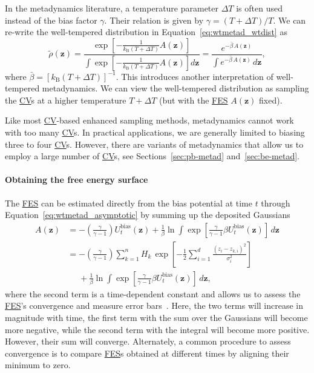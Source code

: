 \documentclass[9pt,review]{livecoms}
\newcommand{\vz}{\mathbf{z}}
\begin{document}
In the metadynamics literature, a temperature parameter $\Delta T$ is often used instead of the bias factor $\gamma$. Their relation is given by $\gamma = (T + \Delta T)/T$. We can re-write the well-tempered distribution in Equation~\ref{eq:wtmetad_wtdist} as 
\begin{equation}
\label{eq:wtmetad_wtdist_deltaT}
\tilde{\rho}(\vz) =
\frac
{\exp\left[-\frac{1}{k_\mathrm{B}(T+\Delta T)}A(\vz)\right]}
{\int \exp\left[-\frac{1}{k_\mathrm{B}(T+\Delta T)}A(\vz)\right] d\vz}=
\frac
{e^{-\bar{\beta} \, A(\vz)}}
{\int e^{-\bar{\beta} \, A(\vz)} \, d\vz},
\end{equation}
where $\bar{\beta}=\left[k_\mathrm{B}(T+\Delta T)\right]^{-1}$. This introduces another interpretation of well-tempered metadynamics. We can view the well-tempered distribution as sampling the \hyperlink{ref:CV} {CV}s at a higher temperature $T+\Delta T$ (but with the \hyperlink{ref:FES} {FES} $A(\vz)$ fixed). 

Like most \hyperlink{ref:CV} {CV}-based enhanced sampling methods, metadynamics cannot work with too many \hyperlink{ref:CV} {CV}s. In practical applications, we are generally limited to biasing three to four \hyperlink{ref:CV} {CV}s. However, there are variants of metadynamics that allow us to employ a large number of \hyperlink{ref:CV} {CV}s, see Sections~\ref{sec:pb-metad} and~\ref{sec:be-metad}.

\paragraph{Obtaining the free energy surface}
\label{sec:metad_obtaining_fes}
The \hyperlink{ref:FES} {FES} can be estimated directly from the bias potential at time $t$ through Equation~\ref{eq:wtmetad_asymptotic} by summing up the deposited Gaussians
\begin{align}
\label{eq:metad_sumhills}
A(\vz) &=
- \left(\frac{\gamma}{\gamma-1}\right) U_{t}^{\mathrm{bias}}(\vz) + 
\frac{1}{\beta}
\ln 
\int \exp
\left[
\frac{\gamma}{\gamma-1} \beta U_{t}^{\mathrm{bias}}(\vz)
\right] \, d\vz 
\nonumber
\\
& =
- \left(\frac{\gamma}{\gamma-1}\right)
\sum_{k=1}^{n}
H_{k} \,
\exp \left[-\frac{1}{2}\sum^{d}_{i=1} \frac{(z_i-z_{k,i})^2}{\sigma^2_i} \right] 
\nonumber \\
& \phantom{=}
+ 
\frac{1}{\beta}
\ln 
\int \exp
\left[
\frac{\gamma}{\gamma-1} \beta U_{t}^{\mathrm{bias}}(\vz)
\right] \, d\vz
,
\end{align}
where the second term is a time-dependent constant and allows us to assess the \hyperlink{ref:FES} {FES}'s convergence and measure error bars~\cite{tiwary_rewt,Valsson2016_ARPC_MetaD}. Here, the two terms will increase in magnitude with time, the first term with the sum over the Gaussians will become more negative, while the second term with the integral will become more positive. However, their sum will converge. Alternately, a common procedure to assess convergence is to compare \hyperlink{ref:FES} {FES}s obtained at different times by aligning their minimum to zero.
\end{document}
